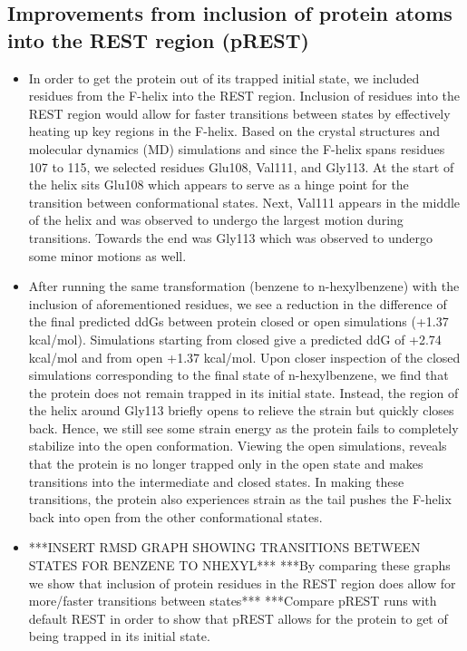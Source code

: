 \documentclass{article}
\begin{document}
\subsection{Improvements from inclusion of protein atoms into the REST region (pREST)}
   \begin{itemize}
   \item In order to get the protein out of its trapped initial state, we included residues from the F-helix into the REST region.
      Inclusion of residues into the REST region would allow for faster transitions between states by effectively heating up key regions in the F-helix.
      Based on the crystal structures and molecular dynamics (MD) simulations and since the F-helix spans residues 107 to 115, we selected residues Glu108, Val111, and Gly113.
      At the start of the helix sits Glu108 which appears to serve as a hinge point for the transition between conformational states. 
      Next, Val111 appears in the middle of the helix and was observed to undergo the largest motion during transitions. 
      Towards the end was Gly113 which was observed to undergo some minor motions as well.
   \item After running the same transformation (benzene to n-hexylbenzene) with the inclusion of aforementioned residues, 
      we see a reduction in the difference of the final predicted ddGs between protein closed or open simulations (+1.37 kcal/mol).
      Simulations starting from closed give a predicted ddG of +2.74 kcal/mol and from open +1.37 kcal/mol.
      Upon closer inspection of the closed simulations corresponding to the final state of n-hexylbenzene, we find that the protein does not remain trapped in its initial state.
      Instead, the region of the helix around Gly113 briefly opens to relieve the strain but quickly closes back. 
      Hence, we still see some strain energy as the protein fails to completely stabilize into the open conformation.
      Viewing the open simulations, reveals that the protein is no longer trapped only in the open state and makes transitions into the intermediate and closed states.
      In making these transitions, the protein also experiences strain as the tail pushes the F-helix back into open from the other conformational states.
   \item ***INSERT RMSD GRAPH SHOWING TRANSITIONS BETWEEN STATES FOR BENZENE TO NHEXYL***
      ***By comparing these graphs we show that inclusion of protein residues in the REST region does allow for more/faster transitions between states***
      ***Compare pREST runs with default REST in order to show that pREST allows for the protein to get of being trapped in its initial state.

\end{itemize}
\end{document}
